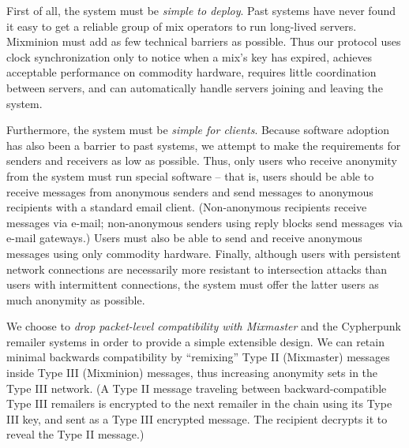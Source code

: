 \documentclass[final,inpress,inline]{ieee}
\begin{document}

First of all, the system must be \emph{simple to deploy}. 
Past systems have never found it easy to get a reliable group of mix
operators to run long-lived servers. Mixminion must add as few
technical barriers as possible.  Thus our protocol uses clock
synchronization only to notice when a mix's key has expired, achieves
acceptable performance on commodity hardware, requires little
coordination between servers, and can automatically handle servers
joining and leaving the system.

Furthermore, the system must be \emph{simple for clients}.
Because software adoption has also been a barrier to past
systems, we attempt to make the requirements for senders and receivers as low
as possible. Thus, only users who receive anonymity from the system must run
special software -- that is, users should be able to receive messages
from anonymous senders and send messages to anonymous recipients with a
standard email client.  (Non-anonymous recipients receive messages via
e-mail; non-anonymous senders using reply blocks send messages via e-mail gateways.)
Users must also be able to send and receive anonymous messages
using only commodity hardware. Finally, although users with persistent
network connections are necessarily more resistant to intersection
attacks than users with intermittent connections, the system must offer
the latter users as much anonymity as possible.


We choose to \emph{drop packet-level compatibility with Mixmaster} and the
Cypherpunk remailer systems in order to provide a simple extensible
design. We can retain minimal backwards compatibility by ``remixing'' Type II
(Mixmaster) messages inside Type III (Mixminion) messages, thus increasing
anonymity sets in the Type III network. (A Type II message traveling between
backward-compatible Type III remailers is encrypted to
the next remailer in the chain using its Type III key, and sent as a Type III
encrypted message.  The recipient decrypts it to reveal the Type II
message.)
\end{document}
